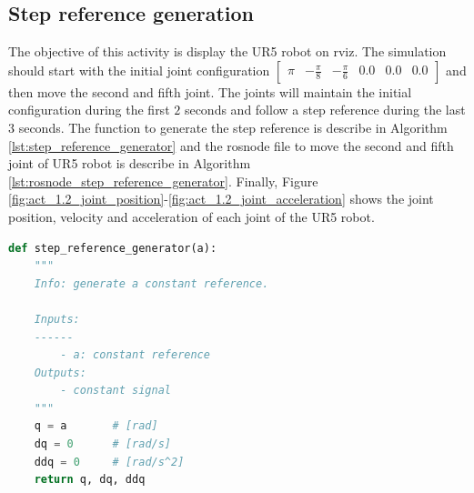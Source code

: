 \subsection{Step reference generation}
The objective of this activity is display the UR5 robot on rviz. The simulation should start with the initial joint configuration $\begin{bmatrix} \pi & -\frac{\pi}{8} & -\frac{\pi}{6} & 0.0 & 0.0 & 0.0 \end{bmatrix}$ and then move the second and fifth joint. The joints will maintain the initial configuration during the first $2$ seconds and follow a step reference during the last $3$ seconds. The function to generate the step reference is describe in Algorithm \ref{lst:step_reference_generator} and the rosnode file to move the second and fifth joint of UR5 robot is describe in Algorithm \ref{lst:rosnode_step_reference_generator}. Finally, Figure \ref{fig:act_1.2_joint_position}-\ref{fig:act_1.2_joint_acceleration} shows the joint position, velocity and acceleration of each joint of the UR5 robot.

\begin{lstlisting}[language=Python,caption=Function to generate step reference., label={lst:step_reference_generator}]
def step_reference_generator(a):
    """
    Info: generate a constant reference.

    Inputs:
    ------
        - a: constant reference
    Outputs:
        - constant signal 
    """
    q = a       # [rad]
    dq = 0      # [rad/s]
    ddq = 0     # [rad/s^2]
    return q, dq, ddq
\end{lstlisting}



\begin{lstlisting}[language=Python, caption={Rosnode to move the second and fifth joint of UR5 robot with the requirement motion of activity 1.2.}, label={lst:step_reference_generator}]


\end{lstlisting}


